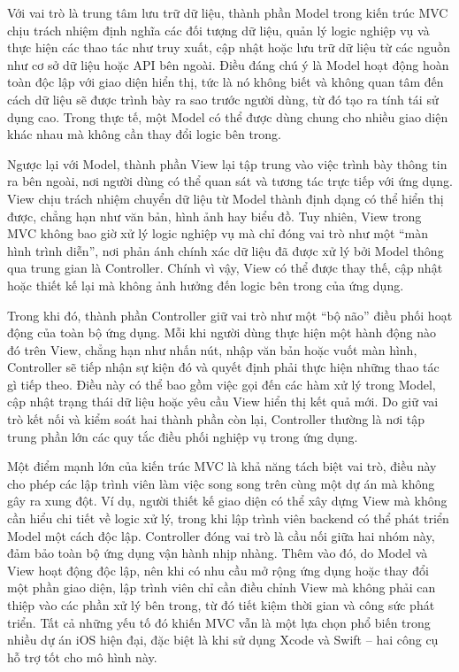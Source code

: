     
      Với vai trò là trung tâm lưu trữ dữ liệu, thành phần Model trong kiến trúc MVC chịu trách nhiệm định nghĩa các đối tượng dữ liệu, quản lý logic nghiệp vụ và thực hiện các thao tác như truy xuất, cập nhật hoặc lưu trữ dữ liệu từ các nguồn như cơ sở dữ liệu hoặc API bên ngoài. Điều đáng chú ý là Model hoạt động hoàn toàn độc lập với giao diện hiển thị, tức là nó không biết và không quan tâm đến cách dữ liệu sẽ được trình bày ra sao trước người dùng, từ đó tạo ra tính tái sử dụng cao. Trong thực tế, một Model có thể được dùng chung cho nhiều giao diện khác nhau mà không cần thay đổi logic bên trong.
    \vspace{0.5em}

    
      Ngược lại với Model, thành phần View lại tập trung vào việc trình bày thông tin ra bên ngoài, nơi người dùng có thể quan sát và tương tác trực tiếp với ứng dụng. View chịu trách nhiệm chuyển dữ liệu từ Model thành định dạng có thể hiển thị được, chẳng hạn như văn bản, hình ảnh hay biểu đồ. Tuy nhiên, View trong MVC không bao giờ xử lý logic nghiệp vụ mà chỉ đóng vai trò như một “màn hình trình diễn”, nơi phản ánh chính xác dữ liệu đã được xử lý bởi Model thông qua trung gian là Controller. Chính vì vậy, View có thể được thay thế, cập nhật hoặc thiết kế lại mà không ảnh hưởng đến logic bên trong của ứng dụng.
    \vspace{0.5em}

    
      Trong khi đó, thành phần Controller giữ vai trò như một “bộ não” điều phối hoạt động của toàn bộ ứng dụng. Mỗi khi người dùng thực hiện một hành động nào đó trên View, chẳng hạn như nhấn nút, nhập văn bản hoặc vuốt màn hình, Controller sẽ tiếp nhận sự kiện đó và quyết định phải thực hiện những thao tác gì tiếp theo. Điều này có thể bao gồm việc gọi đến các hàm xử lý trong Model, cập nhật trạng thái dữ liệu hoặc yêu cầu View hiển thị kết quả mới. Do giữ vai trò kết nối và kiểm soát hai thành phần còn lại, Controller thường là nơi tập trung phần lớn các quy tắc điều phối nghiệp vụ trong ứng dụng.
    \vspace{0.5em}

    
      Một điểm mạnh lớn của kiến trúc MVC là khả năng tách biệt vai trò, điều này cho phép các lập trình viên làm việc song song trên cùng một dự án mà không gây ra xung đột. Ví dụ, người thiết kế giao diện có thể xây dựng View mà không cần hiểu chi tiết về logic xử lý, trong khi lập trình viên backend có thể phát triển Model một cách độc lập. Controller đóng vai trò là cầu nối giữa hai nhóm này, đảm bảo toàn bộ ứng dụng vận hành nhịp nhàng. Thêm vào đó, do Model và View hoạt động độc lập, nên khi có nhu cầu mở rộng ứng dụng hoặc thay đổi một phần giao diện, lập trình viên chỉ cần điều chỉnh View mà không phải can thiệp vào các phần xử lý bên trong, từ đó tiết kiệm thời gian và công sức phát triển. Tất cả những yếu tố đó khiến MVC vẫn là một lựa chọn phổ biến trong nhiều dự án iOS hiện đại, đặc biệt là khi sử dụng Xcode và Swift – hai công cụ hỗ trợ tốt cho mô hình này.



